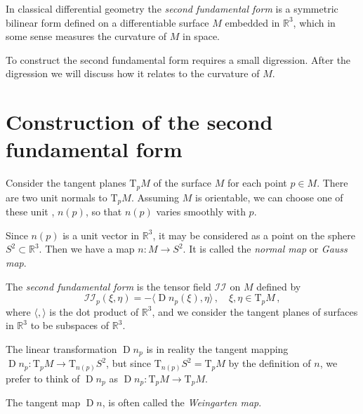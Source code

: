 \documentclass[12pt]{article}
\newcommand{\real}{\mathbb{R}}
\providecommand{\defnterm}[1]{\emph{#1}}
\DeclareMathOperator{\D}{D}
\newcommand{\TpM}{\mathrm{T}_p M}
\newcommand{\ctwo}{\mathcal{II}}
\begin{document}

In classical differential geometry
the \defnterm{second fundamental form} is a symmetric bilinear form
defined on a differentiable surface $M$ embedded in $\real^3$, which in some sense
measures the curvature of $M$ in space.

To construct the second fundamental form requires a small digression.
After the digression we will discuss how it relates to the curvature of $M$.

\section*{Construction of the second fundamental form}
Consider the tangent planes $\TpM$ of the surface $M$ for each point $p \in M$.
There are two unit normals to $\TpM$.
Assuming $M$ is orientable, we can choose one of these unit , $n(p)$,
so that $n(p)$ varies smoothly with $p$.

Since $ n(p)$ is a unit vector in $\real^3$, it may be considered
as a point on the sphere $S^2 \subset \real^3$.  Then we
have a map $ n\colon M \to S^2$.  It is called the \defnterm{normal map}
or \defnterm{Gauss map}.

The \defnterm{second fundamental form} is the tensor field $\ctwo$ on $M$ defined
by
\begin{equation}\label{def}
\ctwo_p(\xi, \eta) = - \langle \D n_p(\xi), \eta \rangle\,, \quad \xi, \eta \in \TpM\,, 
\end{equation}
where $\langle, \rangle$ is the dot product of $\real^3$,
and we consider the tangent planes of surfaces in $\real^3$
to be subspaces of $\real^3$.

The linear transformation $\D n_p$ is in reality the tangent mapping
$\D n_p \colon \TpM \to \mathrm{T}_{ n(p)} S^2$,
but since $\mathrm{T}_{ n(p)}S^2 = \TpM$ by the definition of $ n$,
we prefer to think of $\D n_p$ as $\D n_p \colon \TpM \to \TpM$.

The tangent map $\D n$, is often called the \defnterm{Weingarten map}.
\end{document}
